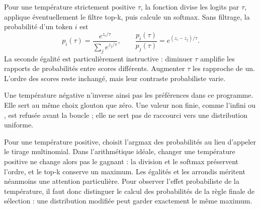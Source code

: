 


Pour une température strictement positive $\tau$, la fonction divise les
logits par $\tau$, applique éventuellement le filtre top-k, puis calcule
un softmax. Sans filtrage, la probabilité d'un token $i$ est
\[
 p_i(\tau)=\frac{e^{z_i/\tau}}{\sum_j e^{z_j/\tau}},
 \qquad
 \frac{p_i(\tau)}{p_j(\tau)}=e^{(z_i-z_j)/\tau}.
\]
La seconde égalité est particulièrement instructive : diminuer $\tau$ amplifie
les rapports de probabilités entre scores différents. Augmenter $\tau$ les
rapproche de un. L'ordre des scores reste inchangé, mais leur contraste
probabiliste varie.


Une température négative n'inverse ainsi pas les préférences dans ce programme.
Elle sert au même choix glouton que zéro. Une valeur non finie, comme
l'infini ou , est refusée avant la boucle ; elle ne sert pas de
raccourci vers une distribution uniforme.

Pour une température positive,  choisit l'argmax des
probabilités au lieu d'appeler le tirage multinomial. Dans l'arithmétique
idéale, changer une température positive ne change alors pas le gagnant :
la division et le softmax préservent l'ordre, et le top-k conserve un maximum.
Les égalités et les arrondis méritent néanmoins une attention particulière.
Pour observer l'effet probabiliste de la température, il faut donc distinguer
le calcul des probabilités de la règle finale de sélection : une distribution
modifiée peut garder exactement le même maximum.

